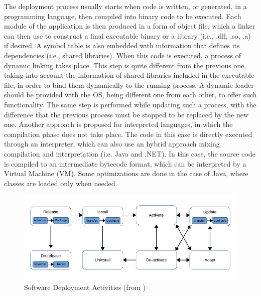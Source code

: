 The deployment process usually starts when code is written, or generated, in a programming language, then compiled into binary code to be executed.
Each module of the application is then produced in a form of object file, which a linker can then use to construct a final executable binary or a library (i.e., .dll, .so, .a) if desired.
A symbol table is also embedded with information that defines its dependencies (i.e., shared libraries).
When this code is executed, a process of dynamic linking takes place.
This step is quite different from the previous one, taking into account the information of shared libraries included in the executable file, in order to bind them dynamically to the running process.
A dynamic loader should be provided with the OS, being different one from each other, to offer such functionality.
The same step is performed while updating such a process, with the difference that the previous process must be stopped to be replaced by the new one.
Another approach is proposed for interpreted languages, in which the compilation phase does not take place.
The code in this case is directly executed through an interpreter, which can also use an hybrid approach mixing compilation and interpretation (i.e. Java and .NET).
In this case, the source code is compiled to an intermediate bytecode format, which can be interpreted by a Virtual Machine (VM).
Some optimizations are done in the case of Java, where classes are loaded only when needed.

\begin{figure}[htb]
	\centering
	\includegraphics[width=1\columnwidth]{chapters/Deployment.images/DeploymentActivities.pdf}
	\caption{Software Deployment Activities (from \cite{gunalp2014continuous})}
	\label{fig:DeployActivities}
\end{figure}

